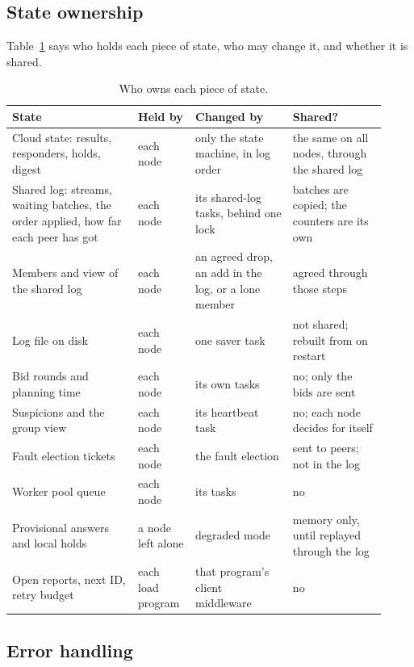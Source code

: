 \clearpage
\subsection{State ownership}

Table~\ref{tab:ownership} says who holds each piece of state, who may change it, and whether it is shared.

\begin{table}[!htb]
\centering\small
\caption{Who owns each piece of state.}
\label{tab:ownership}
\begin{tabular}{@{}p{0.31\linewidth}p{0.14\linewidth}p{0.24\linewidth}p{0.23\linewidth}@{}}
\toprule
State & Held by & Changed by & Shared? \\
\midrule
Cloud state: results, responders, holds, digest & each node & only the state machine, in log order & the same on all nodes, through the shared log \\
Shared log: streams, waiting batches, the order applied, how far each peer has got & each node & its shared-log tasks, behind one lock & batches are copied; the counters are its own \\
Members and view of the shared log & each node & an agreed drop, an add in the log, or a lone member & agreed through those steps \\
Log file on disk & each node & one saver task & not shared; rebuilt from on restart \\
Bid rounds and planning time & each node & its own tasks & no; only the bids are sent \\
Suspicions and the group view & each node & its heartbeat task & no; each node decides for itself \\
Fault election tickets & each node & the fault election & sent to peers; not in the log \\
Worker pool queue & each node & its tasks & no \\
Provisional answers and local holds & a node left alone & degraded mode & memory only, until replayed through the log \\
Open reports, next ID, retry budget & each load program & that program's client middleware & no \\
\bottomrule
\end{tabular}
\end{table}

\subsection{Error handling}

